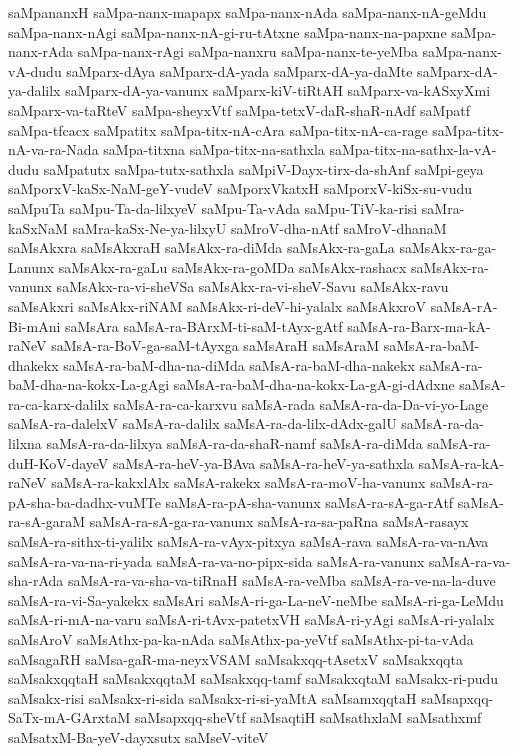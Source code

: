 {saMpananxH
saMpa-nanx-mapapx
saMpa-nanx-nAda
saMpa-nanx-nA-geMdu
saMpa-nanx-nAgi
saMpa-nanx-nA-gi-ru-tAtxne
saMpa-nanx-na-papxne
saMpa-nanx-rAda
saMpa-nanx-rAgi
saMpa-nanxru
saMpa-nanx-te-yeMba
saMpa-nanx-vA-dudu
saMparx-dAya
saMparx-dA-yada
saMparx-dA-ya-daMte
saMparx-dA-ya-dalilx
saMparx-dA-ya-vanunx
saMparx-kiV-tiRtAH
saMparx-va-kASxyXmi
saMparx-va-taRteV
saMpa-sheyxVtf
saMpa-tetxV-daR-shaR-nAdf
saMpatf
saMpa-tfcacx
saMpatitx
saMpa-titx-nA-cAra
saMpa-titx-nA-ca-rage
saMpa-titx-nA-va-ra-Nada
saMpa-titxna
saMpa-titx-na-sathxla
saMpa-titx-na-sathx-la-vA-dudu
saMpatutx
saMpa-tutx-sathxla
saMpiV-Dayx-tirx-da-shAnf
saMpi-geya
saMporxV-kaSx-NaM-geY-vudeV
saMporxVkatxH
saMporxV-kiSx-su-vudu
saMpuTa
saMpu-Ta-da-lilxyeV
saMpu-Ta-vAda
saMpu-TiV-ka-risi
saMra-kaSxNaM
saMra-kaSx-Ne-ya-lilxyU
saMroV-dha-nAtf
saMroV-dhanaM
saMsAkxra
saMsAkxraH
saMsAkx-ra-diMda
saMsAkx-ra-gaLa
saMsAkx-ra-ga-Lanunx
saMsAkx-ra-gaLu
saMsAkx-ra-goMDa
saMsAkx-rashacx
saMsAkx-ra-vanunx
saMsAkx-ra-vi-sheVSa
saMsAkx-ra-vi-sheV-Savu
saMsAkx-ravu
saMsAkxri
saMsAkx-riNAM
saMsAkx-ri-deV-hi-yalalx
saMsAkxroV
saMsA-rA-Bi-mAni
saMsAra
saMsA-ra-BArxM-ti-saM-tAyx-gAtf
saMsA-ra-Barx-ma-kA-raNeV
saMsA-ra-BoV-ga-saM-tAyxga
saMsAraH
saMsAraM
saMsA-ra-baM-dhakekx
saMsA-ra-baM-dha-na-diMda
saMsA-ra-baM-dha-nakekx
saMsA-ra-baM-dha-na-kokx-La-gAgi
saMsA-ra-baM-dha-na-kokx-La-gA-gi-dAdxne
saMsA-ra-ca-karx-dalilx
saMsA-ra-ca-karxvu
saMsA-rada
saMsA-ra-da-Da-vi-yo-Lage
saMsA-ra-dalelxV
saMsA-ra-dalilx
saMsA-ra-da-lilx-dAdx-galU
saMsA-ra-da-lilxna
saMsA-ra-da-lilxya
saMsA-ra-da-shaR-namf
saMsA-ra-diMda
saMsA-ra-duH-KoV-dayeV
saMsA-ra-heV-ya-BAva
saMsA-ra-heV-ya-sathxla
saMsA-ra-kA-raNeV
saMsA-ra-kakxlAlx
saMsA-rakekx
saMsA-ra-moV-ha-vanunx
saMsA-ra-pA-sha-ba-dadhx-vuMTe
saMsA-ra-pA-sha-vanunx
saMsA-ra-sA-ga-rAtf
saMsA-ra-sA-garaM
saMsA-ra-sA-ga-ra-vanunx
saMsA-ra-sa-paRna
saMsA-rasayx
saMsA-ra-sithx-ti-yalilx
saMsA-ra-vAyx-pitxya
saMsA-rava
saMsA-ra-va-nAva
saMsA-ra-va-na-ri-yada
saMsA-ra-va-no-pipx-sida
saMsA-ra-vanunx
saMsA-ra-va-sha-rAda
saMsA-ra-va-sha-va-tiRnaH
saMsA-ra-veMba
saMsA-ra-ve-na-la-duve
saMsA-ra-vi-Sa-yakekx
saMsAri
saMsA-ri-ga-La-neV-neMbe
saMsA-ri-ga-LeMdu
saMsA-ri-mA-na-varu
saMsA-ri-tAvx-patetxVH
saMsA-ri-yAgi
saMsA-ri-yalalx
saMsAroV
saMsAthx-pa-ka-nAda
saMsAthx-pa-yeVtf
saMsAthx-pi-ta-vAda
saMsagaRH
saMsa-gaR-ma-neyxVSAM
saMsakxqq-tAsetxV
saMsakxqqta
saMsakxqqtaH
saMsakxqqtaM
saMsakxqq-tamf
saMsakxqtaM
saMsakx-ri-pudu
saMsakx-risi
saMsakx-ri-sida
saMsakx-ri-si-yaMtA
saMsamxqqtaH
saMsapxqq-SaTx-mA-GArxtaM
saMsapxqq-sheVtf
saMsaqtiH
saMsathxlaM
saMsathxmf
saMsatxM-Ba-yeV-dayxsutx
saMseV-viteV
}
